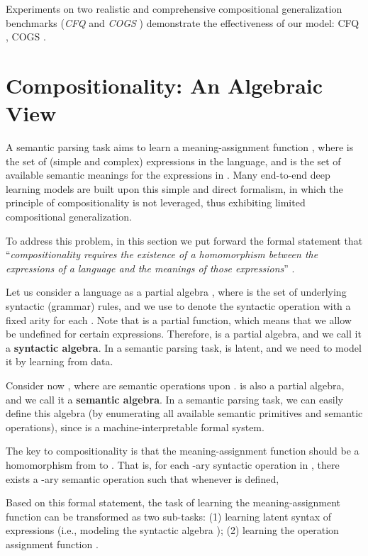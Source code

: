 \documentclass[11pt,a4paper]{article}
\begin{document}
Experiments on two realistic and comprehensive compositional generalization benchmarks (\textit{CFQ} \cite{keysers2019measuring} and \textit{COGS} \cite{kim2020cogs}) demonstrate the effectiveness of our model:
CFQ , COGS .



\section{Compositionality: An Algebraic View}\label{section:algebra}

A semantic parsing task aims to learn a meaning-assignment function , where  is the set of (simple and complex) expressions in the language, and  is the set of available semantic meanings for the expressions in .
Many end-to-end deep learning models are built upon this simple and direct formalism, in which the principle of compositionality is not leveraged, thus exhibiting limited compositional generalization.

To address this problem, in this section we put forward the formal statement that ``\textit{compositionality requires the existence of a homomorphism between the expressions of a language and the meanings of those expressions}'' \cite{montague1970universal-algre}.

Let us consider a language as a partial algebra , where  is the set of underlying syntactic (grammar) rules, and we use  to denote the syntactic operation with a fixed arity  for each .
Note that  is a partial function, which means that we allow  be undefined for certain expressions.
Therefore,  is a partial algebra, and we call it a \textbf{syntactic algebra}.
In a semantic parsing task,  is latent, and we need to model it by learning from data.

Consider now , where  are semantic operations upon .
 is also a partial algebra, and we call it a \textbf{semantic algebra}.
In a semantic parsing task, we can easily define this algebra (by enumerating all available semantic primitives and semantic operations), since  is a machine-interpretable formal system.

The key to compositionality is that the meaning-assignment function  should be a homomorphism from  to .
That is, for each -ary syntactic operation  in ,
there exists a -ary semantic operation  such that whenever  is defined,


Based on this formal statement, the task of learning the meaning-assignment function  can be transformed as two sub-tasks: (1) learning latent syntax of expressions (i.e., modeling the syntactic algebra ); (2) learning the operation assignment function .
\end{document}
